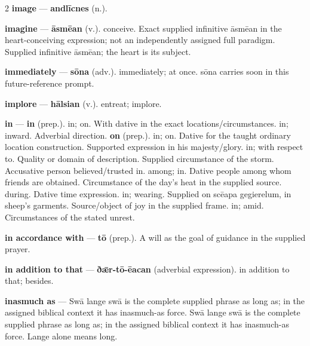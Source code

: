 \begin{multicols}{2}
\textbf{image} — \textbf{andlīcnes} (n.).\par
\textbf{imagine} — \textbf{āsmēan} (v.). conceive. Exact supplied infinitive āsmēan in the heart-conceiving expression; not an independently assigned full paradigm. Supplied infinitive āsmēan; the heart is its subject.\par
\textbf{immediately} — \textbf{sōna} (adv.). immediately; at once. sōna carries soon in this future-reference prompt.\par
\textbf{implore} — \textbf{hālsian} (v.). entreat; implore.\par
\textbf{in} — \textbf{in} (prep.). in; on. With dative in the exact locations/circumstances. in; inward. Adverbial direction. \textbf{on} (prep.). in; on. Dative for the taught ordinary location construction. Supported expression in his majesty/glory. in; with respect to. Quality or domain of description. Supplied circumstance of the storm. Accusative person believed/trusted in. among; in. Dative people among whom friends are obtained. Circumstance of the day's heat in the supplied source. during. Dative time expression. in; wearing. Supplied on scēapa gegierelum, in sheep's garments. Source/object of joy in the supplied frame. in; amid. Circumstances of the stated unrest.\par
\textbf{in accordance with} — \textbf{tō} (prep.). A will as the goal of guidance in the supplied prayer.\par
\textbf{in addition to that} — \textbf{ðǣr-tō-ēacan} (adverbial expression). in addition to that; besides.\par
\textbf{inasmuch as} — Swā lange swā is the complete supplied phrase as long as; in the assigned biblical context it has inasmuch-as force. Swā lange swā is the complete supplied phrase as long as; in the assigned biblical context it has inasmuch-as force. Lange alone means long.\par

\end{multicols}
